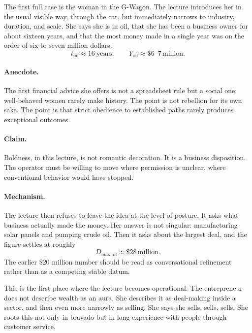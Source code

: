 The first full case is the woman in the G-Wagon. The lecture introduces her in the usual visible way, through the car, but immediately narrows to industry, duration, and scale. She says she is in oil, that she has been a business owner for about sixteen years, and that the most money made in a single year was on the order of six to seven million dollars:
\begin{equation}
t_{\text{oil}} \approx 16\ \text{years},
\qquad
Y_{\text{oil}} \approx \$6\text{--}7\,\text{million}.
\end{equation}

\paragraph{Anecdote.}
The first financial advice she offers is not a spreadsheet rule but a social one: well-behaved women rarely make history. The point is not rebellion for its own sake. The point is that strict obedience to established paths rarely produces exceptional outcomes.

\paragraph{Claim.}
Boldness, in this lecture, is not romantic decoration. It is a business disposition. The operator must be willing to move where permission is unclear, where conventional behavior would have stopped.

\paragraph{Mechanism.}
The lecture then refuses to leave the idea at the level of posture. It asks what business actually made the money. Her answer is not singular: manufacturing solar panels and pumping crude oil. Then it asks about the largest deal, and the figure settles at roughly
\begin{equation}
D_{\text{max,oil}} \approx \$28\,\text{million}.
\end{equation}
The earlier \(\$20\) million number should be read as conversational refinement rather than as a competing stable datum.

This is the first place where the lecture becomes operational. The entrepreneur does not describe wealth as an aura. She describes it as deal-making inside a sector, and then even more narrowly as selling. She says she sells, sells, sells. She roots this not only in bravado but in long experience with people through customer service.

